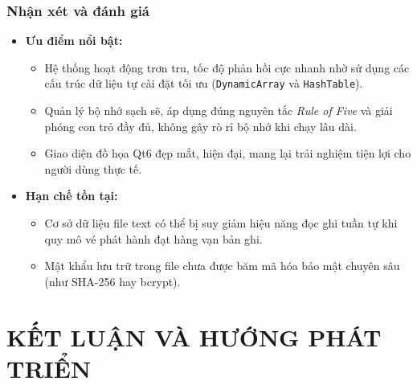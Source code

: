 \documentclass[12pt,a4paper]{article}
\begin{document}
\subsubsection{Nhận xét và đánh giá}
\begin{itemize}
    \item \textbf{Ưu điểm nổi bật:}
    \begin{itemize}
        \item Hệ thống hoạt động trơn tru, tốc độ phản hồi cực nhanh nhờ sử dụng các cấu trúc dữ liệu tự cài đặt tối ưu (\texttt{DynamicArray} và \texttt{HashTable}).
        \item Quản lý bộ nhớ sạch sẽ, áp dụng đúng nguyên tắc \textit{Rule of Five} và giải phóng con trỏ đầy đủ, không gây rò rỉ bộ nhớ khi chạy lâu dài.
        \item Giao diện đồ họa Qt6 đẹp mắt, hiện đại, mang lại trải nghiệm tiện lợi cho người dùng thực tế.
    \end{itemize}
    \item \textbf{Hạn chế tồn tại:}
    \begin{itemize}
        \item Cơ sở dữ liệu file text có thể bị suy giảm hiệu năng đọc ghi tuần tự khi quy mô vé phát hành đạt hàng vạn bản ghi.
        \item Mật khẩu lưu trữ trong file chưa được băm mã hóa bảo mật chuyên sâu (như SHA-256 hay bcrypt).
    \end{itemize}
\end{itemize}

\section*{KẾT LUẬN VÀ HƯỚNG PHÁT TRIỂN}
\end{document}
